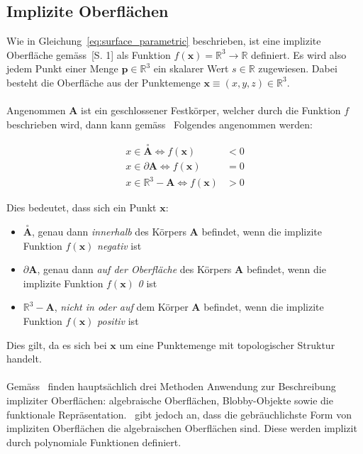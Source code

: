 \subsection{Implizite Oberflächen}
\label{subsec:implicit_surfaces}

Wie in Gleichung~\ref{eq:surface_parametric} beschrieben, ist eine implizite
Oberfläche gemäss~\cite{hart_ray_1993}[S. 1] als Funktion $ f(\bm{x}) =
\mathbb{R}^{3} \to \mathbb{R} $ definiert.  Es wird also jedem Punkt einer
Menge $ \bm{p} \in \mathbb{R}^{3} $ ein skalarer Wert $ s \in \mathbb{R} $
zugewiesen. Dabei besteht die Oberfläche aus der Punktemenge $ \bm{x} \equiv
(x, y, z) \in \mathbb{R}^{3} $.\\
\\
Angenommen $ \bm{A} $ ist ein geschlossener Festkörper, welcher durch die
Funktion $f$ beschrieben wird, dann kann gemäss~\cite{hart_ray_1993} Folgendes
angenommen werden:

\begin{align} \label{eq:surface_implicit_condition}
    x \in \overset{\circ}{\bm{A}} \Leftrightarrow f(\bm{x}) &< 0 \\
    x \in \partial \bm{A}         \Leftrightarrow f(\bm{x}) &= 0 \\
    x \in \mathbb{R}^{3} - \bm{A} \Leftrightarrow f(\bm{x}) &> 0
\end{align}

Dies bedeutet, dass sich ein Punkt $\bm{x}$:
\begin{itemize}
    \item $\overset{\circ}{\bm{A}}$, genau dann \textit{innerhalb} des Körpers
        $\bm{A}$ befindet, wenn die implizite Funktion $f(\bm{x})$ \textit{negativ}
        ist
    \item $\partial{\bm{A}}$, genau dann \textit{auf der Oberfläche} des
        Körpers $\bm{A}$ befindet, wenn die implizite Funktion $f(\bm{x})$
        \textit{0} ist
    \item $\mathbb{R}^{3} - \bm{A}$, \textit{nicht in oder auf} dem Körper
        $\bm{A}$ befindet, wenn die implizite Funktion $f(\bm{x})$ \textit{positiv}
        ist
\end{itemize}

Dies gilt, da es sich bei $ \bm{x} $ um eine Punktemenge mit topologischer
Struktur handelt.\\
\\
Gemäss~\cite{division_introduction_1996} finden hauptsächlich drei Methoden
Anwendung zur Beschreibung impliziter Oberflächen: algebraische Oberflächen,
Blobby-Objekte sowie die funktionale Repräsentation.~\cite{hart_sphere_1994}
gibt jedoch an, dass die gebräuchlichste Form von impliziten Oberflächen die
algebraischen Oberflächen sind. Diese werden implizit durch polynomiale
Funktionen definiert.\\

